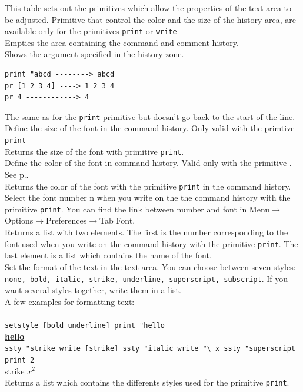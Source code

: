 This table sets out the primitives which allow the properties of the text area to be adjusted. Primitive that control the color and the size of the history area, are available only for the primitives \texttt{print} or \texttt{write}\\
Empties the area containing the command and comment history.\\
Shows the argument specified in the history zone.
\begin{verbatim}
print "abcd --------> abcd
pr [1 2 3 4] ----> 1 2 3 4
pr 4 ------------> 4
\end{verbatim}
\noindent {}
The same as for the \texttt{print} primitive but doesn't go back to the start of the line.\\
 Define the size of the font in the command history. Only valid with the primtive \texttt{print}\\
 Returns the size of the font with primitive \texttt{print}.\\
Define the color of the font in command history. Valid only with the primitive . See p.\pageref{couleurs}.\\
 Returns the color of the font with the primitive \texttt{print} in the command history.\\
Select the font number n when you write on the the command history with the primitive \texttt{print}. You can find the link between number and font in Menu$\to$Options$\to$Preferences$\to$Tab Font.\\
Returns a list with two elements. The first is the number corresponding to the font used when you write on the command history with the primitive \texttt{print}. The last element is a list which contains the name of the font.\\
Set the format of the text in the text area. You can choose between seven styles: \texttt{none, bold, italic, strike, underline, superscript, subscript}. If you want several styles together, write them in a list.\\
A few examples for formatting text:\\ \\
\texttt{setstyle [bold underline] print "hello}\\
\textbf{\underline{hello}}\\
\texttt{ssty "strike write [strike] ssty "italic write "\textbackslash\ x ssty "superscript print 2}\\
\sout{strike} $x^2$\\
Returns a list which contains the differents styles used for the primitive \texttt{print}.
